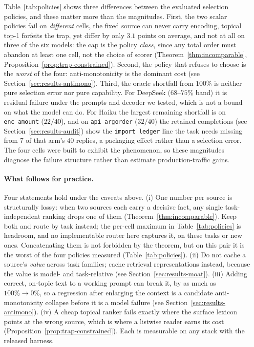 \documentclass[11pt]{article}
\theoremstyle{plain}
\theoremstyle{definition}
\theoremstyle{remark}
\begin{document}
Table~\ref{tab:policies} shows three differences between the evaluated selection policies, and
these matter more than the magnitudes. First, the two scalar policies fail on
\emph{different} cells, the fixed source can never carry encoding, topical top-1 forfeits the trap,
yet differ by only $3.1$ points on average, and not at all on three of the six models: the cap
is the policy \emph{class}, since
any total order must abandon at least one cell, not the choice of scorer
(Theorem~\ref{thm:incomparable}, Proposition~\ref{prop:trap-constrained}). Second, the policy that
refuses to choose is the \emph{worst} of the four: anti-monotonicity is the dominant cost
(see Section~\ref{sec:results-antimono}). Third, the oracle shortfall from $100\%$ is neither pure selection
error nor pure capability. For DeepSeek ($68$--$75\%$ band) it is residual failure under the
prompts and decoder we tested, which is not a bound on what the model can do. For Haiku the
largest remaining shortfall is on \texttt{enc\_amount} ($22/40$), and on \texttt{api\_argorder}
($32/40$) the retained completions (see Section~\ref{sec:results-audit}) show the
\texttt{import ledger} line the task needs missing from $7$ of that arm's $40$ replies, a
packaging effect rather than a selection error. The four cells were built to exhibit the phenomenon, so
these magnitudes diagnose the failure structure rather than estimate production-traffic gains.

\paragraph{What follows for practice.} Four statements hold under the caveats above.
(i) One number per source is structurally lossy: when two sources each carry a decisive fact, any
single task-independent ranking drops one of them (Theorem~\ref{thm:incomparable}). Keep both and
route by task instead; the per-cell maximum in Table~\ref{tab:policies} is headroom, and no
implementable router here captures it, on these tasks or new
ones. Concatenating them is not forbidden
by the theorem, but on this pair it is the worst of the four policies measured
(Table~\ref{tab:policies}).
(ii) Do not cache a source's \emph{value} across task families; cache retrieval representations
instead, because the value is model- and task-relative (see Section~\ref{sec:results-moat}).
(iii) Adding correct, on-topic text to a working prompt can break it, by as much as
$100\%\to0\%$, so a regression after enlarging the context is a candidate anti-monotonicity
collapse before it is a model failure (see Section~\ref{sec:results-antimono}).
(iv) A cheap topical ranker fails exactly where the surface lexicon points at the wrong source,
which is where a listwise reader earns its cost (Proposition~\ref{prop:trap-constrained}).
Each is measurable on any stack with the released harness.
\end{document}
